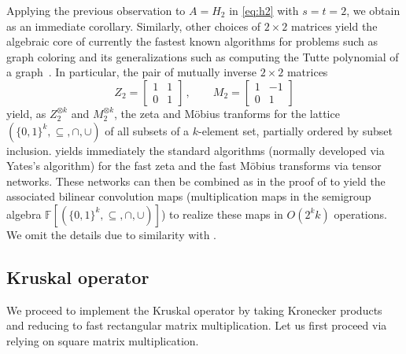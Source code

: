 \documentclass{toc}
\newcommand{\F}{\ensuremath{\mathbb{F}}}
\begin{document}
Applying the previous observation to $A=H_2$ in \eqref{eq:h2} with $s=t=2$,
we obtain  as an immediate corollary. Similarly,
other choices of $2\times 2$ matrices yield the algebraic core of currently
the fastest known algorithms for problems such as graph coloring
and its generalizations such as computing the Tutte polynomial of
a graph~\cite{BjorklundHKK2007,BjorklundHKK2008,BjorklundHK2009}.
In particular, the pair of mutually inverse $2\times 2$ matrices
\[
Z_2=\left[\begin{array}{rr}
1&1\\
0&1
\end{array}\right]\,,\qquad
M_2=\left[\begin{array}{rr}
1&-1\\
0&1
\end{array}\right]
\]
yield, as $Z_2^{\otimes k}$ and $M_2^{\otimes k}$, the zeta and
M\"obius tranforms for the lattice $(\{0,1\}^k,\subseteq,\cap,\cup)$
of all subsets of a $k$-element set, partially ordered by subset inclusion.
 yields immediately the standard algorithms
(normally developed via Yates's algorithm)
for the fast zeta and the fast M\"obius transforms via tensor networks.
These networks can then be combined as in the proof of
 to yield the associated bilinear convolution maps
(multiplication maps in the semigroup algebra
$\F[(\{0,1\}^k,\subseteq,\cap,\cup)]$) to realize these maps in
$O(2^kk)$ operations. We omit the details due to similarity
with .



\subsection{Kruskal operator}

We proceed to implement the Kruskal operator by taking Kronecker products
and reducing to fast rectangular matrix multiplication. Let us first
proceed via  relying on square matrix multiplication.
\end{document}
